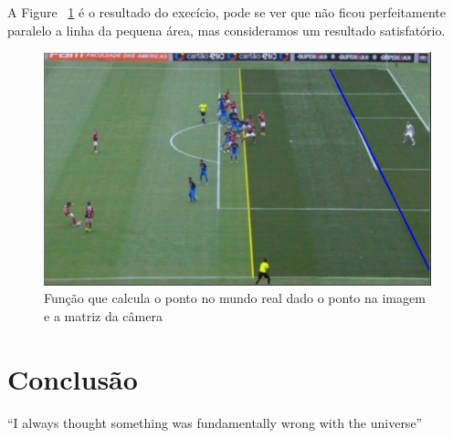 \documentclass{article}
\begin{document}
    A Figure ~\ref{fig:result2} é o resultado do execício, pode se ver que não ficou perfeitamente paralelo a linha da pequena área, mas consideramos um resultado satisfatório.
        \begin{figure}[h!]
        \includegraphics[scale=0.5]{result2.PNG}
        \caption{Função que calcula o ponto no mundo real dado o ponto na imagem e a matriz da câmera}
        \label{fig:result2}
        \end{figure}
    

\section{Conclusão}
``I always thought something was fundamentally wrong with the universe'' \citep{adams1995hitchhiker}



\end{document}
